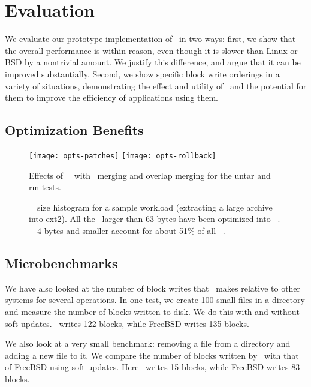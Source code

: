 \section {Evaluation}
\label{sec:evaluation}

We evaluate our prototype implementation of \Kudos\ in two ways: first, we
show that the overall performance is within reason, even though it is slower
than Linux or BSD by a nontrivial amount. We justify this difference, and argue
that it can be improved substantially. Second, we show specific block write
orderings in a variety of situations, demonstrating the effect and utility of
\opgroups\ and the potential for them to improve the efficiency of applications
using them.

\subsection {Optimization Benefits}

\begin{figure}[htb]
\centering
\texttt{[image: opts-patches]}
\texttt{[image: opts-rollback]}
\caption{Effects of \nrb\ \chdescs\ with \nrb\ merging and overlap
  merging for the untar and rm tests.}
\label{fig:opts}
\end{figure}

\begin{figure}[htb]
\vspace{-0.5\baselineskip}
\vspace{-0.5\baselineskip}
\caption{\label{fig:patchsize-histo} \Rb\ \chdesc\ size histogram for a sample
  workload (extracting a large archive into ext2). All the \chdescs\ larger than
  63 bytes have been optimized into \nrb\ \chdescs. \Rb\ \chdescs\ 4 bytes and
  smaller account for about 51\% of all \rb\ \chdescs.}
\end{figure}

\subsection {Microbenchmarks}
We have also looked at the number of block writes that \Kudos\ makes
relative to other systems for several operations. In one test, we
create 100 small files in a directory and measure the number of blocks
written to disk. We do this with and without soft updates. \Kudos\
writes 122 blocks, while FreeBSD writes 135 blocks.

We also look at a very small benchmark: removing a file from a
directory and adding a new file to it. We compare the number of blocks
written by \Kudos\ with that of FreeBSD using soft updates. Here
\Kudos\ writes 15 blocks, while FreeBSD writes 83 blocks.

